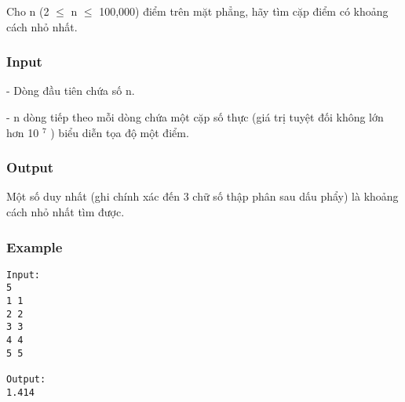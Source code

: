 



   Cho n (2  $\le$  n  $\le$  100,000) điểm trên mặt phẳng, hãy tìm cặp điểm có khoảng cách nhỏ nhất.  

\subsubsection{   Input  }

   - Dòng đầu tiên chứa số n.  

   - n dòng tiếp theo mỗi dòng chứa một cặp số thực (giá trị tuyệt đối không lớn hơn 10   $^    7   $   ) biểu diễn tọa độ một điểm.  

\subsubsection{   Output  }

   Một số duy nhất (ghi chính xác đến 3 chữ số thập phân sau dấu phẩy) là khoảng cách nhỏ nhất tìm được.  

\subsubsection{   Example  }
\begin{verbatim}
Input:
5
1 1
2 2
3 3
4 4
5 5

Output:
1.414
\end{verbatim}
